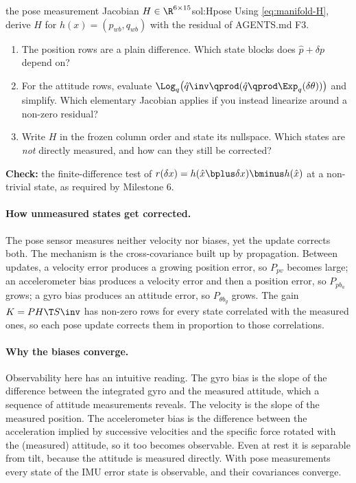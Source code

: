 \begin{derivex}{the pose measurement Jacobian $H \in \R^{6\times15}$}{sol:Hpose}
Using \eqref{eq:manifold-H}, derive $H$ for $h(x) = (p_{wb}, q_{wb})$ with the residual of AGENTS.md F3.
\begin{enumerate}
  \item The position rows are a plain difference. Which state blocks does $\hat p + \delta p$ depend on?
  \item For the attitude rows, evaluate $\Log_q\big(\hat q\inv\qprod(\hat q\qprod\Exp_q(\delta\theta))\big)$ and simplify.
        Which elementary Jacobian applies if you instead linearize around a non-zero residual?
  \item Write $H$ in the frozen column order and state its nullspace. Which states are \emph{not} directly measured,
        and how can they still be corrected?
\end{enumerate}
\textbf{Check:} the finite-difference test of $r(\delta x) = h(\hat x\bplus\delta x)\bminus h(\hat x)$ at a non-trivial state, as
required by Milestone 6.
\end{derivex}

\paragraph{How unmeasured states get corrected.} The pose sensor measures neither velocity nor biases, yet the
update corrects both. The mechanism is the cross-covariance built up by propagation. Between updates, a velocity
error produces a growing position error, so $P_{pv}$ becomes large; an accelerometer bias produces a velocity error
and then a position error, so $P_{p b_a}$ grows; a gyro bias produces an attitude error, so $P_{\theta b_g}$ grows. The gain
$K = PH\T S\inv$ has non-zero rows for every state correlated with the measured ones, so each pose update corrects
them in proportion to those correlations.

\paragraph{Why the biases converge.} Observability here has an intuitive reading. The gyro bias is the slope of the
difference between the integrated gyro and the measured attitude, which a sequence of attitude measurements reveals.
The velocity is the slope of the measured position. The accelerometer bias is the difference between the
acceleration implied by successive velocities and the specific force rotated with the (measured) attitude, so it
too becomes observable. Even at rest it is separable from tilt, because the attitude is measured directly. With
pose measurements every state of the IMU error state is observable, and their covariances converge.

